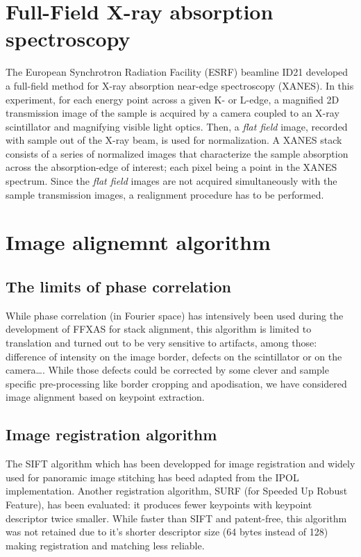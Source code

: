 \documentclass[preprint]{iucr}
\begin{document}
\section{Full-Field X-ray absorption spectroscopy}
The European Synchrotron Radiation Facility (ESRF) beamline ID21 developed a
full-field method for X-ray absorption near-edge spectroscopy\cite{fullfield}
(XANES). 
In this experiment, for each energy point across a given K- or L-edge,
a magnified 2D transmission image of the sample is acquired by a camera coupled
to an X-ray scintillator and magnifying visible light optics.
Then, a \emph{flat field} image, recorded with sample out of the X-ray beam, is
used for normalization.
A XANES stack consists of a series of normalized images that characterize the
sample absorption across the absorption-edge of interest; each pixel being a
point in the XANES spectrum.
Since the \emph{flat field} images are not acquired simultaneously with the
sample transmission images, a realignment procedure has to be performed.


\section{Image alignemnt algorithm}

\subsection{The limits of phase correlation}

While phase correlation (in Fourier space) has intensively been used during the
development of FFXAS for stack alignment, this algorithm is limited to
translation and turned out to be very sensitive to artifacts, among those:
difference of intensity on  the image border, defects on the scintillator or on
the camera\ldots.
While those defects could be corrected by some clever and sample
specific pre-processing like border cropping and apodisation, we have considered
image alignment based on keypoint extraction.

\subsection{Image registration algorithm}

The SIFT algorithm \cite{Lowe1999,Lowe2004} which has been developped
for image registration and widely used for panoramic image stitching has beed
adapted from the IPOL\cite{ASIFT} implementation.
Another registration algorithm, SURF (for Speeded Up Robust Feature\cite{surf}),
has been evaluated: it produces fewer keypoints with keypoint descriptor twice
smaller. 
While faster than SIFT and patent-free, this algorithm was not
retained due to it's shorter descriptor size (64 bytes instead of 128) making 
registration and matching less reliable.
\end{document}
